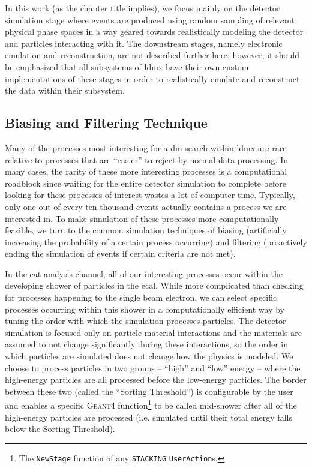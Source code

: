 In this work (as the chapter title implies), we focus mainly on the detector simulation stage where
events are produced using random sampling of relevant physical phase spaces in a way geared towards
realistically modeling the detector and particles interacting with it. The downstream stages,
namely electronic emulation and reconstruction, are not described further here; however, it should
be emphasized that all subsystems of \ac{ldmx} have their own custom implementations of these
stages in order to realistically emulate and reconstruct the data within their subsystem.

\subsection{Biasing and Filtering Technique} \label{sec:bias-and-filter}
Many of the processes most interesting for a \ac{dm} search within \ac{ldmx} are rare relative to
processes that are ``easier'' to reject by normal data processing.
In many cases, the rarity of these more interesting processes is a computational roadblock
since waiting for the entire detector simulation to complete before looking for these processes
of interest wastes a lot of computer time.
Typically, only one out of every ten thousand events actually contains a process we are interested in.
To make simulation of these processes more computationally feasible, we turn to the common simulation
techniques of biasing (artificially increasing the probability of a certain process occurring) and
filtering (proactively ending the simulation of events if certain criteria are not met).

In the \ac{eat} analysis channel, all of our interesting processes occur within the developing
shower of particles in the \ac{ecal}.
While more complicated than checking for processes happening to the single beam electron,
we can select specific processes occurring within this shower in a computationally
efficient way by tuning the order with which the simulation processes particles.
The detector simulation is focused only on particle-material interactions
and the materials are assumed to not change significantly during these interactions, so the order 
in which particles are simulated does not change how the physics is modeled.
We choose to process particles in two groups -- ``high'' and ``low'' energy --
where the high-energy particles are all processed before the low-energy particles.
The border between these two (called the ``Sorting Threshold'') is configurable by the user and
enables a specific \textsc{Geant4} function\footnote{
The \texttt{NewStage} function of any \texttt{STACKING} \texttt{UserAction}s. 
} to be called mid-shower after all of the high-energy particles are processed
(i.e. simulated until their total energy falls below the Sorting Threshold).

